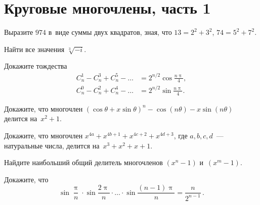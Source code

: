 
\section*{Круговые многочлены, часть 1}


\begingroup
    \ifdefined\mathup
        \def\piconst{\mathup{\pi}}%
    \else
        \def\piconst{\uppi}%
    \fi

\begin{problems}

Выразите $974$ в~виде суммы двух квадратов, зная, что $13 = 2 ^ 2 + 3 ^ 2$,
$74 = 5^2 + 7^2$.

\item
Найти все значения $\sqrt[3]{-i}$.

\item
Докажите тождества
\begin{align*}
    C_{n}^{1} - C_{n}^{3} + C_{n}^{5} - \ldots
& =
    2^{n/2} \cos \frac{n \piconst}{4}
, \\
    C_{n}^{0} - C_{n}^{2} + C_{n}^{4} - \ldots
& =
    2^{n/2} \sin \frac{n \piconst}{4}
. \end{align*}

\item
Докажите, что многочлен
\(
    (\cos\theta + x \sin\theta)^{n}
    - \cos(n \theta) - x \sin(n \theta)
\) делится на~$x^2 + 1$.

\item
Докажите, что многочлен
\(
    x^{4a} + x^{4b + 1} + x^{4c + 2} + x^{4d + 3}
\), где $a, b, c, d$~--- натуральные числа, делится на~$x^3 + x^2 + x + 1$.

\item
Найдите наибольший общий делитель многочленов $(x^{n} - 1)$ и~$(x^{m} - 1)$.

\item
Докажите, что
\[
    \sin \frac{\piconst}{n} \cdot \sin \frac{2 \piconst}{n}
    \cdot \ldots \cdot
    \sin \frac{(n - 1) \piconst}{n}
=
    \frac{n}{2^{n-1}}
\, . \]

\end{problems}

